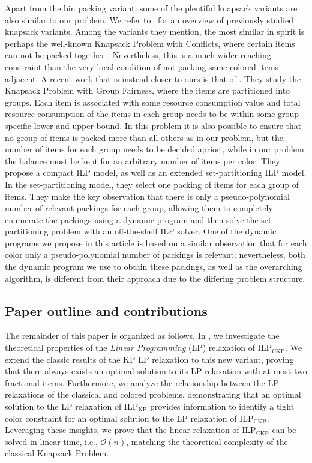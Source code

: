 \documentclass[preprint,11pt]{elsarticle}
\newcommand{\formKP}{\text{ILP}_\text{KP}}
\newcommand{\formCKP}{\text{ILP}_\text{CKP}}
\theoremstyle{definition}
\begin{document}
Apart from the bin packing variant, some of the plentiful knapsack variants are also similar to our problem.
We refer to~\cite{CACCHIANI2022105692} for an overview of previously studied knapsack variants. 
Among the variants they mention, the most similar in spirit is perhaps the well-known Knapsack Problem with Conflicts, where certain items can not be packed together \citep[see, e.g.,][for a recent exact algorithm for the problem]{ConiglioFS21}.
Nevertheless, this is a much wider-reaching constraint than the very local condition of not packing same-colored items adjacent. 
A recent work that is instead closer to ours is that of \citet{malaguti_algorithms_2025}.
They study the Knapsack Problem with Group Fairness, where the items are partitioned into groups. 
Each item is associated with some resource consumption value and total resource consumption of the items in each group needs to be within some group-specific lower and upper bound. 
In this problem it is also possible to ensure that no group of items is packed more than all others as in our problem, but the number of items for each group needs to be decided apriori, while in our problem the balance must be kept for an arbitrary number of items per color.
They propose a compact ILP model, as well as an extended set-partitioning ILP model.
In the set-partitioning model, they select one packing of items for each group of items.
They make the key observation that there is only a pseudo-polynomial number of relevant packings for each group, allowing them to completely enumerate the packings using a dynamic program and then solve the set-partitioning problem with an off-the-shelf ILP solver.
One of the dynamic programs we propose in this article is based on a similar observation that for each color only a pseudo-polynomial number of packings is relevant; nevertheless, both the dynamic program we use to obtain these packings, as well as the overarching algorithm, is different from their approach due to the differing problem structure.

\subsection{Paper outline and contributions}
The remainder of this paper is organized as follows. 
In , we investigate the theoretical properties of the \textit{Linear Programming} (LP) relaxation of $\formCKP$. We extend the classic results of the KP LP relaxation to this new variant, proving that there always exists an optimal solution to its LP relaxation with at most two fractional items. Furthermore, we analyze the relationship between the LP relaxations of the classical and colored problems, demonstrating that an optimal solution to the LP relaxation of $\formKP$ provides information to identify a tight color constraint for an optimal solution to the LP relaxation of $\formCKP$. Leveraging these insights, we prove that the linear relaxation of $\formCKP$ can be solved in linear time, i.e., $\mathcal{O}(n)$, matching the theoretical complexity of the classical Knapsack Problem.
\end{document}
